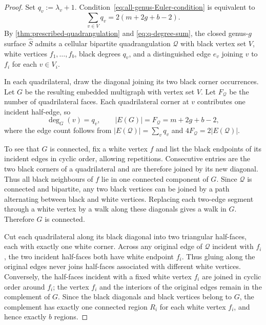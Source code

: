 \documentclass[11pt]{amsart}
\theoremstyle{definition}
\theoremstyle{plain}
\theoremstyle{definition}
\theoremstyle{definition}
\newcommand{\cQ}{\mathcal Q}
\begin{document}
\begin{proof}
Set $q_v:=\lambda_v+1$.  Condition~\eqref{eq:all-genus-Euler-condition} is equivalent to
\begin{equation}
\label{eq:q-degree-sum}
 \sum_{v\in V}q_v=2(m+2g+b-2).
\end{equation}
By \cref{thm:prescribed-quadrangulation} and \eqref{eq:q-degree-sum},
the closed genus-$g$ surface $\widehat S$ admits a cellular bipartite
quadrangulation $\cQ$ with black vertex set $V$, white vertices
$f_1,\ldots,f_b$, black degrees $q_v$, and a distinguished edge
$e_v$ joining $v$ to $f_i$ for each $v\in V_i$.

In each quadrilateral, draw the diagonal joining its two black corner
occurrences.  Let $G$ be the resulting embedded multigraph with vertex set
$V$. Let $F_{\cQ}$ be the number of quadrilateral faces.
Each quadrilateral corner at $v$ contributes one incident half-edge, so
\begin{equation}
\label{eq:black-diagonal-counts}
 \deg_G(v)=q_v,
 \qquad
 |E(G)|=F_{\cQ}=m+2g+b-2,
\end{equation}
where the edge count follows from $|E(\cQ)|=\sum_vq_v$ and
$4F_{\cQ}=2|E(\cQ)|$.

To see that $G$ is connected, fix a white vertex $f$ and list the
black endpoints of its incident edges in cyclic order, allowing
repetitions.  Consecutive entries are the two black corners of
a quadrilateral and are therefore joined by its new diagonal.
Thus all black neighbours of $f$ lie in one connected component
of $G$.  Since $\cQ$ is connected and bipartite, any two black
vertices can be joined by a path alternating between black and
white vertices.  Replacing each two-edge segment through a white
vertex by a walk along these diagonals gives a walk in $G$.
Therefore $G$ is connected.

Cut each quadrilateral along its black diagonal into two triangular
half-faces, each with exactly one white corner.  Across any original
edge of $\cQ$ incident with $f_i$, the two incident half-faces both
have white endpoint $f_i$.  Thus gluing along the original edges never joins half-faces
associated with different white vertices.  Conversely, the half-faces
incident with a fixed white vertex $f_i$ are joined in cyclic order
around $f_i$; the vertex $f_i$ and the interiors of the original edges
remain in the complement of $G$.  Since the black diagonals and black
vertices belong to $G$, the complement has exactly one connected
region $R_i$ for each white vertex $f_i$, and hence exactly $b$ regions.


\end{proof}
\end{document}

